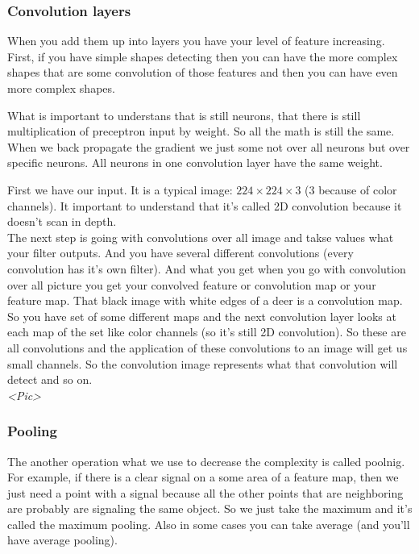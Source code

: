 \subsubsection*{Convolution layers}

When you add them up into layers you have your level of feature increasing. First, if you have simple shapes detecting then you can have the more complex shapes that are some convolution of those features and then you can have even more complex shapes.

What is important to understans that is still neurons, that there is still multiplication of preceptron input by weight. So all the math is still the same. When we back propagate the gradient we just some not over all neurons but over specific neurons. All neurons in one convolution layer have the same weight.

First we have our input. It is a typical image: $224\times224\times3$ (3 because of color channels). It important to understand that it's called 2D convolution because it doesn't scan in depth.\\
The next step is going with convolutions over all image and takse values what your filter outputs. And you have several different convolutions (every convolution has it's own filter). And what you get when you go with convolution over all picture you get your convolved feature or convolution map or your feature map. That black image with white edges of a deer is a convolution map. So you have set of some different maps and the next convolution layer looks at each map of the set like color channels (so it's still 2D convolution). So these are all convolutions and the application of these convolutions to an image will get us small channels. So the convolution image represents what that convolution will detect and so on.\\
{\it <Pic>}

\subsubsection*{Pooling}

The another operation what we use to decrease the complexity is called poolnig. For example, if there is a clear signal on a some area of a feature map, then we just need a point with a signal because all the other points that are neighboring are probably are signaling the same object. So we just take the maximum and it's called the maximum pooling. Also in some cases you can take average (and you'll have average pooling).


